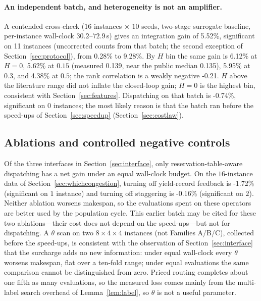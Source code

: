 \documentclass[manuscript,screen,review]{acmart}
\newcommand{\MatrixCells}{16}
\newcommand{\GainIntegMatrix}{5.52\%}    %
\newcommand{\SigIntegMatrix}{11}         %
\newcommand{\GainIntegMatrixLo}{0.28\%}
\newcommand{\GainIntegMatrixHi}{9.28\%}
\newcommand{\GainProbePre}{-0.74\%}      %
\newcommand{\GainCertMatrix}{-1.72\%}    %
\newcommand{\GainStaggerMatrix}{-0.16\%} %
\newcommand{\GainIntegHZero}{6.12\%}
\newcommand{\GainIntegHLow}{5.62\%}      %
\newcommand{\GainIntegHMid}{5.95\%}      %
\newcommand{\GainIntegHHigh}{4.38\%}     %
\newcommand{\MatrixHMeasLow}{0.139}      %
\newcommand{\RhoIntegH}{-0.21}           %
\newcommand{\PubHMed}{0.135}             %
\begin{document}
\paragraph{An independent batch, and heterogeneity is not an amplifier.}
A contended cross-check ($\MatrixCells$ instances $\times$ $10$ seeds, two-stage surrogate baseline, per-instance wall-clock $30.2$--$72.9$\,s) gives an integration gain of \GainIntegMatrix{}, significant on \SigIntegMatrix{} instances (uncorrected counts from that batch; the second exception of Section~\ref{sec:protocol}), from \GainIntegMatrixLo{} to \GainIntegMatrixHi{}.
By $H$ bin the same gain is \GainIntegHZero{} at $H=0$, \GainIntegHLow{} at $0.15$ (measured \MatrixHMeasLow{}, near the public median \PubHMed{}), \GainIntegHMid{} at $0.3$, and \GainIntegHHigh{} at $0.5$; the rank correlation is a weakly negative \RhoIntegH{}.
$H$ above the literature range did not inflate the closed-loop gain; $H=0$ is the highest bin, consistent with Section~\ref{sec:features}.
Dispatching on that batch is \GainProbePre{}, significant on $0$ instances; the most likely reason is that the batch ran before the speed-ups of Section~\ref{sec:speedup} (Section~\ref{sec:costlaw}).

\subsection{Ablations and controlled negative controls}
\label{sec:pricing}

Of the three interfaces in Section~\ref{sec:interface}, only reservation-table-aware dispatching has a net gain under an equal wall-clock budget.
On the $\MatrixCells$-instance data of Section~\ref{sec:whichcongestion}, turning off yield-record feedback is \GainCertMatrix{} (significant on $1$ instance) and turning off staggering is \GainStaggerMatrix{} (significant on $2$).
Neither ablation worsens makespan, so the evaluations spent on these operators are better used by the population cycle.
This earlier batch may be cited for these two ablations---their cost does not depend on the speed-ups---but not for dispatching.
A $\theta$ scan on two $8\times4\times4$ instances (not Families A/B/C), collected before the speed-ups, is consistent with the observation of Section~\ref{sec:interface} that the surcharge adds no new information: under equal wall-clock every $\theta$ worsens makespan, flat over a ten-fold range; under equal evaluations the same comparison cannot be distinguished from zero.
Priced routing completes about one fifth as many evaluations, so the measured loss comes mainly from the multi-label search overhead of Lemma~\ref{lem:label}, so $\theta$ is not a useful parameter.
\end{document}
